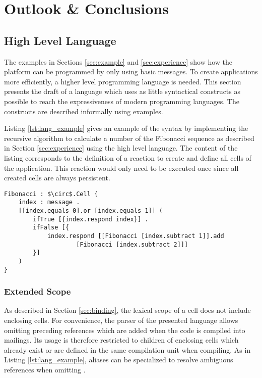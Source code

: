 \graphicspath{{figures/outlook_conclusion/}}

\chapter{Outlook \& Conclusions} %

\section{High Level Language}
\label{sec:language}

The examples in Sections \ref{sec:example} and \ref{sec:experience} show how the platform can be programmed by only using basic messages. To create applications more efficiently, a higher level programming language is needed. This section presents the draft of a language which uses as little syntactical constructs as possible to reach the expressiveness of modern programming languages. The constructs are described informally using examples.

Listing \ref{lst:lang_example} gives an example of the syntax by implementing the recursive algorithm to calculate a number of the Fibonacci sequence as described in Section \ref{sec:experience} using the high level language. The content of the listing corresponds to the definition of a reaction to create and define all cells of the application. This reaction would only need to be executed once since all created cells are always persistent.

\begin{lstlisting}[mathescape, float=hbt, label=lst:lang_example, 
caption=Implementation the Fibonacci algorithm using a high level language]
Fibonacci : $\circ$.Cell {
	index : message .
	[[index.equals 0].or [index.equals 1]] (
		ifTrue [{index.respond index}] .
		ifFalse [{
			index.respond [[Fibonacci [index.subtract 1]].add 
					[Fibonacci [index.subtract 2]]]
		}]
	)
}
\end{lstlisting}


\subsection{Extended Scope}

As described in Section \ref{sec:binding}, the lexical scope of a cell does not include enclosing cells. For convenience, the parser of the presented language allows omitting preceding  references which are added when the code is compiled into mailings. Its usage is therefore restricted to children of enclosing cells which already exist or are defined in the same compilation unit when compiling. As in Listing \ref{lst:lang_example},  aliases can be specialized to resolve ambiguous references when omitting .

